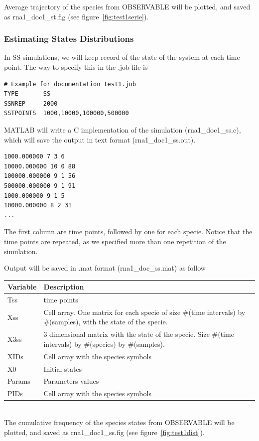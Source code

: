 \documentclass[letterpaper]{article}
\begin{document}
Average trajectory of the species from OBSERVABLE will be plotted, and
saved as \textsf{rna1\_doc1\_st.fig} (see figure~\ref{fig:test1serie}).

\subsubsection{Estimating States Distributions}

In SS simulations, we will keep record of the state of the system at
each time point. The way to specify this in the \textsf{.job} file is
{\footnotesize
\begin{verbatim}
# Example for documentation test1.job
TYPE       SS
SSNREP     2000
SSTPOINTS  1000,10000,100000,500000
\end{verbatim}
}
MATLAB will write a C implementation of the simulation
(\textsf{rna1\_doc1\_ss.c}), which will save the output in text format
(\textsf{rna1\_doc1\_ss.out}).
{\footnotesize
\begin{verbatim}
1000.000000 7 3 6
10000.000000 10 0 88
100000.000000 9 1 56
500000.000000 9 1 91
1000.000000 9 1 5
10000.000000 8 2 31
...
\end{verbatim}
}
The first column are time points, followed by one for each
specie. Notice that the time points are repeated, as we specified more
than one repetition of the simulation.

Output will be saved in \textsf{.mat} format
(\textsf{rna1\_doc\_ss.mat}) as follow \\
\begin{tabular}{|p{1.5cm}|p{9cm}|} 
  \hline
  Variable & Description \\
  \hline
  Tss & time points \\
  Xss & Cell array. One matrix for each specie of size \#(time
  intervals) by \#(samples), with the state of the specie. \\
  X3ss & 3 dimensional matrix with the state of the specie. Size
  \#(time intervals) by \#(species) by \#(samples). \\
  XIDs & Cell array with the species symbols \\
  X0 & Initial states \\
  Params & Parameters values \\
  PIDs & Cell array with the species symbols \\
  \hline
\end{tabular}\\ 

The cumulative frequency of the species states from OBSERVABLE will be
plotted, and saved as \textsf{rna1\_doc1\_ss.fig} (see
figure~\ref{fig:test1dist}).
\end{document}
